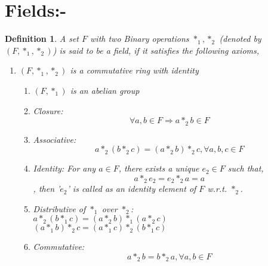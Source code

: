 \documentclass{article}
\newtheorem{defn}{Definition} [section]
\begin{document}
\section{Fields:-}
\begin{defn} A set $F$ with two Binary operations $*_1,*_2$ (denoted by $(F,*_1,*_2)$) is said to be a field, if it satisfies the following axioms,
\begin{enumerate}
	\item $(F,*_1,*_2)$ is a commutative ring with identity 
	\begin{enumerate}
		\item $(F,*_1)$ is an abelian group
	\item Closure: $$\forall a, b \in F \Rightarrow a*_2b \in F$$
	
	\item Associative: $$a*_2(b*_2c)=(a*_2b)*_2c, \forall a,b,c \in F$$
	
	\item Identity: For any $a \in F$, there exists a unique $e_2 \in F$ such that, $$a*_2e_2=e_2*_2a=a$$, then '$e_2$' is called as an identity element of $F$ w.r.t. $*_2$.
		\item Distributive of $*_1$ over $*_2$:\\
	$a*_2(b*_1c)=(a*_2b)*_1 (a*_2c)$\\
	$(a*_1b)*_2c=(a*_1c)*_2 (b*_1c)$
	\item Commutative: $$a*_2b=b*_2a, \forall a,b \in F$$ 
	\end{enumerate}
	

\end{enumerate}
\end{defn}
\end{document}
